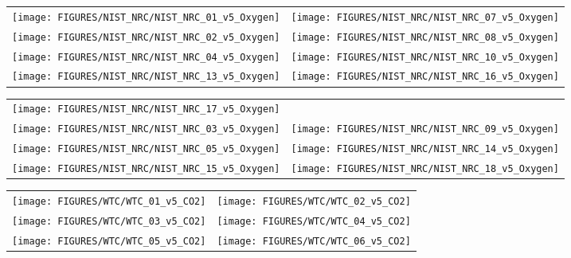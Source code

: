 \begin{figure}[p]
\begin{tabular*}{\textwidth}{l@{\extracolsep{\fill}}r}
\texttt{[image: FIGURES/NIST\_NRC/NIST\_NRC\_01\_v5\_Oxygen]} &
\texttt{[image: FIGURES/NIST\_NRC/NIST\_NRC\_07\_v5\_Oxygen]} \\
\texttt{[image: FIGURES/NIST\_NRC/NIST\_NRC\_02\_v5\_Oxygen]} &
\texttt{[image: FIGURES/NIST\_NRC/NIST\_NRC\_08\_v5\_Oxygen]} \\
\texttt{[image: FIGURES/NIST\_NRC/NIST\_NRC\_04\_v5\_Oxygen]} &
\texttt{[image: FIGURES/NIST\_NRC/NIST\_NRC\_10\_v5\_Oxygen]} \\
\texttt{[image: FIGURES/NIST\_NRC/NIST\_NRC\_13\_v5\_Oxygen]} &
\texttt{[image: FIGURES/NIST\_NRC/NIST\_NRC\_16\_v5\_Oxygen]}
\end{tabular*}
\label{NIST_NRC_Gas_Closed}
\end{figure}

\begin{figure}[p]
\begin{tabular*}{\textwidth}{l@{\extracolsep{\fill}}r}
\texttt{[image: FIGURES/NIST\_NRC/NIST\_NRC\_17\_v5\_Oxygen]} &
 \\
\texttt{[image: FIGURES/NIST\_NRC/NIST\_NRC\_03\_v5\_Oxygen]} &
\texttt{[image: FIGURES/NIST\_NRC/NIST\_NRC\_09\_v5\_Oxygen]} \\
\texttt{[image: FIGURES/NIST\_NRC/NIST\_NRC\_05\_v5\_Oxygen]} &
\texttt{[image: FIGURES/NIST\_NRC/NIST\_NRC\_14\_v5\_Oxygen]} \\
\texttt{[image: FIGURES/NIST\_NRC/NIST\_NRC\_15\_v5\_Oxygen]} &
\texttt{[image: FIGURES/NIST\_NRC/NIST\_NRC\_18\_v5\_Oxygen]}
\end{tabular*}
\label{NIST_NRC_Gas_Open}
\end{figure}


\begin{figure}[p]
\begin{tabular*}{\textwidth}{l@{\extracolsep{\fill}}r}
\texttt{[image: FIGURES/WTC/WTC\_01\_v5\_CO2]} &
\texttt{[image: FIGURES/WTC/WTC\_02\_v5\_CO2]} \\
\texttt{[image: FIGURES/WTC/WTC\_03\_v5\_CO2]} &
\texttt{[image: FIGURES/WTC/WTC\_04\_v5\_CO2]} \\
\texttt{[image: FIGURES/WTC/WTC\_05\_v5\_CO2]} &
\texttt{[image: FIGURES/WTC/WTC\_06\_v5\_CO2]}
\end{tabular*}
\label{NIST_WTC_CO2}
\end{figure}

